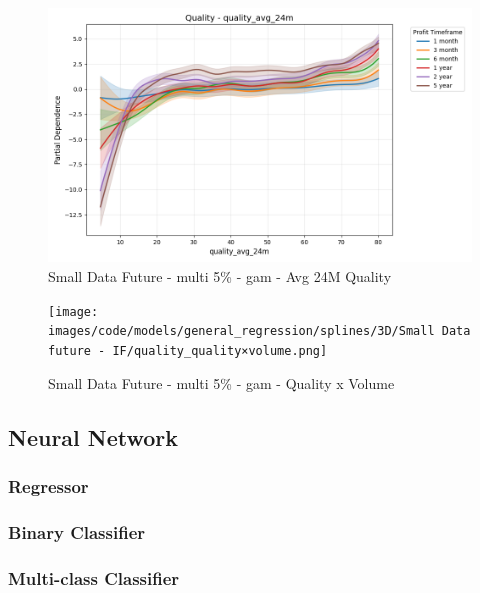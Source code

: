\documentclass[11pt,english,a4paper,hidelinks]{book}
\begin{document}
\begin{figure}[H]
    \centering
    \includegraphics[width=1\textwidth]{images/code/models/general_regression/splines/2D/Small Data future - IF/quality_quality_avg_24m.png}
    \caption{Small Data Future - \acrshort{multi} 5\% - \acrshort{gam} - Avg 24M Quality}
    \label{fig:gam_quality_quality_avg_24m}
\end{figure}

\begin{figure}[H]
    \centering
    \texttt{[image: images/code/models/general\_regression/splines/3D/Small Data future - IF/quality\_quality×volume.png]}
    \caption{Small Data Future - \acrshort{multi} 5\% - \acrshort{gam} - Quality x Volume}
    \label{fig:gam_quality_volume}
\end{figure}



\subsection{Neural Network}

\subsubsection{Regressor}

\subsubsection{Binary Classifier}

\subsubsection{Multi-class Classifier}
\end{document}
